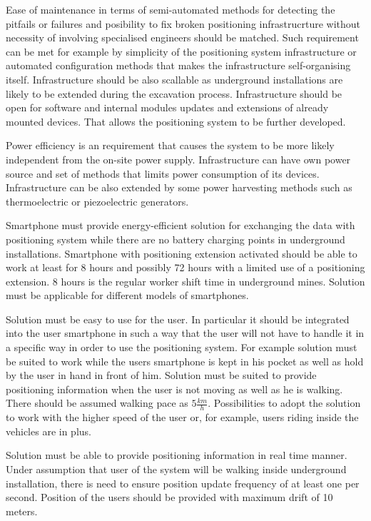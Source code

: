 \documentclass[../main.tex]{subfiles}
\begin{document}
Ease of maintenance in terms of semi-automated methods for detecting the pitfails or failures and posibility to fix broken positioning infrastrucrture without necessity of involving specialised engineers should be matched. Such requirement can be met for example by simplicity of the positioning system infrastructure or automated configuration methods that makes the infrastructure self-organising itself. Infrastructure should be also scallable as underground installations are likely to be extended during the excavation process. Infrastructure should be open for software and internal modules updates and extensions of already mounted devices. That allows the positioning system to be further developed.

Power efficiency is an requirement that causes the system to be more likely independent from the on-site power supply. Infrastructure can have own power source and set of methods that limits power consumption of its devices. Infrastructure can be also extended by some power harvesting methods such as thermoelectric or piezoelectric generators.

Smartphone must provide energy-efficient solution for exchanging the data with positioning system while there are no battery charging points in underground installations. Smartphone with positioning extension activated should be able to work at least for 8 hours and possibly 72 hours with a limited use of a positioning extension. 8 hours is the regular worker shift time in underground mines. Solution must be applicable for different models of smartphones.

Solution must be easy to use for the user. In particular it should be integrated into the user smartphone in such a way that the user will not have to handle it in a specific way in order to use the positioning system. For example solution must be suited to work while the users smartphone is kept in his pocket as well as hold by the user in hand in front of him. Solution must be suited to provide positioning information when the user is not moving as well as he is walking. There should be assumed walking pace as $5 \frac{km}{h}$. Possibilities to adopt the solution to work with the higher speed of the user or, for example, users riding inside the vehicles are in plus.

Solution must be able to provide positioning information in real time manner. Under assumption that user of the system will be walking inside underground installation, there is need to ensure position update frequency of at least one per second. Position of the users should be provided with maximum drift of 10 meters.
\end{document}
